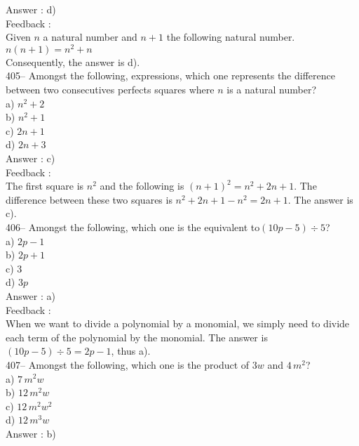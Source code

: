 ﻿\documentclass[letterpaper, 12pt]{article}
\begin{document}
Answer : d)\\

Feedback : \\
Given $n$ a natural number and $n+1$ the following natural number.\\
$n\left( n+1\right)=n^{2}+n$ \\
Consequently, the answer is d).\\

405-- Amongst the following, expressions, which one represents the difference between two consecutives perfects squares where $n$ is a natural number?\\
a) $n^{2}+2$\\
b) $n^{2}+1$\\
c) $2n+1$\\
d) $2n+3$\\

Answer : c)\\

Feedback : \\
The first square is $n^{2}$ and the following is $\left( n+1\right)
^{2}=n^{2}+2n+1$.  The difference between these two squares is $n^{2}+2n+1-n^{2}=2n+1$. The answer is c).\\

406--  Amongst the following, which one is the equivalent to$\left(
10p-5\right) \div 5$?\\
a) $2p-1$\\
b) $2p+1$\\
c) 3\\
d) $3p$\\

Answer : a)\\

Feedback : \\
When we want to divide a polynomial by a monomial, we simply need to divide each term of the polynomial by the monomial. The answer is $\left(
10p-5\right) \div 5=2p-1$, thus a).\\



407-- Amongst the following, which one is the product of $3w$ and
$4\,m^{2}$?\\
a) $7\,m^{2}w$\\
b) $12\,m^{2}w$ \\
c) $12\,m^{2}w^{2}$\\
d) $12\,m^{3}w$\\

Answer : b)\\
\end{document}
